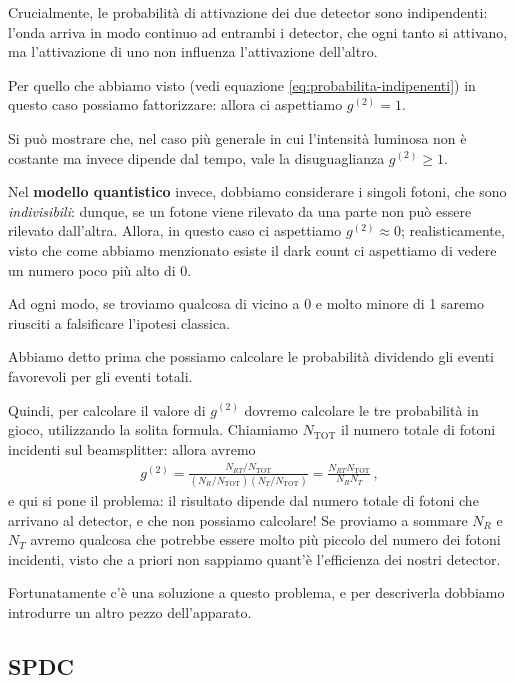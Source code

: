 \documentclass[a4paper,12pt]{article}
\begin{document}
Crucialmente, le probabilità di attivazione dei due detector sono indipendenti: l'onda arriva in modo continuo ad entrambi i detector, che ogni tanto si attivano, ma l'attivazione di uno non influenza l'attivazione dell'altro. 

Per quello che abbiamo visto (vedi equazione \eqref{eq:probabilita-indipenenti}) in questo caso possiamo fattorizzare: allora ci aspettiamo \(g^{(2)} = 1\). 

Si può mostrare che, nel caso più generale in cui l'intensità luminosa non è costante ma invece dipende dal tempo, vale la disuguaglianza \(g^{(2)} \geq 1\).

Nel \textbf{modello quantistico} invece, dobbiamo considerare i singoli fotoni, che sono \emph{indivisibili}: dunque, se un fotone viene rilevato da una parte non può essere rilevato dall'altra. Allora, in questo caso ci aspettiamo \(g^{(2)} \approx 0\); realisticamente, visto che come abbiamo menzionato esiste il dark count ci aspettiamo di vedere un numero poco più alto di 0.

Ad ogni modo, se troviamo qualcosa di vicino a 0 e molto minore di 1 saremo riusciti a falsificare l'ipotesi classica.

Abbiamo detto prima che possiamo calcolare le probabilità dividendo gli eventi favorevoli per gli eventi totali.

Quindi, per calcolare il valore di \(g^{(2)}\) dovremo calcolare le tre probabilità in gioco, utilizzando la solita formula. Chiamiamo \(N _{\text{TOT}}\) il numero totale di fotoni incidenti sul beamsplitter: allora avremo 
%
\begin{align}
g^{(2)} = \frac{N_{RT} / N _{\text{TOT}}}{(N_R / N _{\text{TOT}}) (N_T / N _{\text{TOT}})} = \frac{N_{RT} N _{\text{TOT}}}{N_R N_T}
\,,
\end{align}
%
e qui si pone il problema: il risultato dipende dal numero totale di fotoni che arrivano al detector, e che non possiamo calcolare! Se proviamo a sommare \(N_R\) e \(N_T\) avremo qualcosa che potrebbe essere molto più piccolo del numero dei fotoni incidenti, visto che a priori non sappiamo quant'è l'efficienza dei nostri detector.

Fortunatamente c'è una soluzione a questo problema, e per descriverla dobbiamo introdurre un altro pezzo dell'apparato.

\subsection{SPDC}
\end{document}
